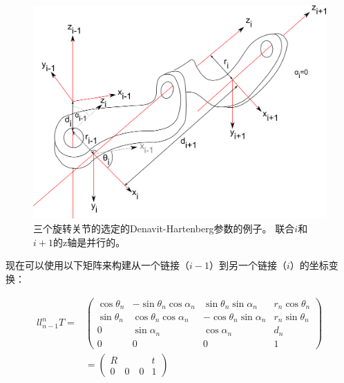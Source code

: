 \begin{figure}
	\centering
		\includegraphics[width=\textwidth]{figs/denavit-hartenberg}
	\caption {三个旋转关节的选定的Denavit-Hartenberg参数的例子。 联合$ i $和$ i + 1$的z轴是并行的。}
	\label{fig:denavit}
\end{figure}




现在可以使用以下矩阵来构建从一个链接（$ i-1 $）到另一个链接（$ i $）的坐标变换：

\begin{eqnarray}{ll}
\nonumber
_{n-1}^nT=&
\left(
\begin{array}{ccc|c}
\cos \theta_n & -\sin \theta_n \cos\alpha_n & \sin\theta_n \sin\alpha_n & r_n \cos\theta_n\\
\sin \theta_n & \cos\theta_n \cos\alpha_n & -\cos\theta_n\sin\alpha_n & r_n \sin\theta_n\\
0 & \sin\alpha_n & \cos\alpha_n & d_n\\
\hline
0 & 0 & 0 & 1
\end{array}
\right)\\
&=
\left(
\begin{array}{c|c}
R & t\\
\hline
0 \quad 0 \quad 0 & 1
\end{array}
\right)
\end{eqnarray}

